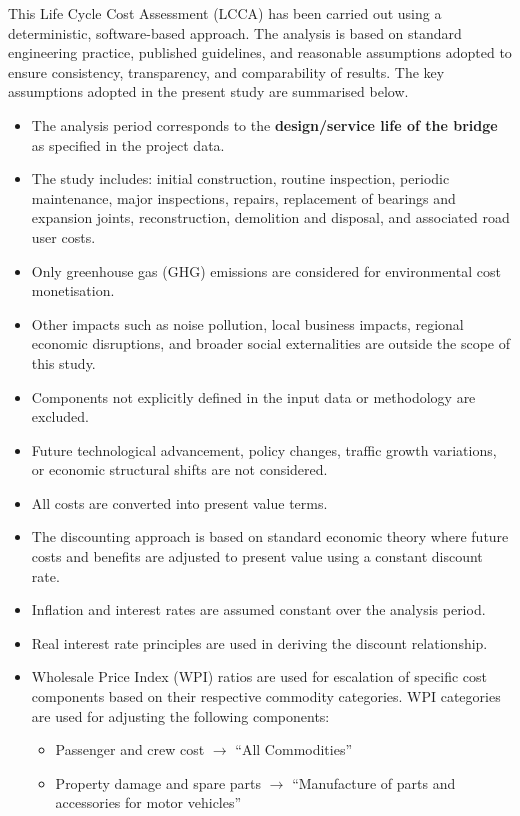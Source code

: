 \documentclass[12pt,a4paper]{article}
\begin{document}
\noindent
This Life Cycle Cost Assessment (LCCA) has been carried out using a deterministic,
software-based approach. The analysis is based on standard engineering practice,
published guidelines, and reasonable assumptions adopted to ensure consistency,
transparency, and comparability of results. The key assumptions adopted in the
present study are summarised below.

\vspace{0.5em}

\begin{itemize}
\item The analysis period corresponds to the \textbf{design/service life of the bridge} as specified in the project data.
\item The study includes: initial construction, routine inspection, periodic maintenance, major inspections, repairs, replacement of bearings and expansion joints, reconstruction, demolition and disposal, and associated road user costs.
\item Only greenhouse gas (GHG) emissions are considered for environmental cost monetisation.
\item Other impacts such as noise pollution, local business impacts, regional economic disruptions, and broader social externalities are outside the scope of this study.
\item Components not explicitly defined in the input data or methodology are excluded.
\item Future technological advancement, policy changes, traffic growth variations, or economic structural shifts are not considered.
\item All costs are converted into present value terms.
\item The discounting approach is based on standard economic theory where future costs and benefits are adjusted to present value using a constant discount rate.
\item Inflation and interest rates are assumed constant over the analysis period.
\item Real interest rate principles are used in deriving the discount relationship.
\item Wholesale Price Index (WPI) ratios are used for escalation of specific cost components based on their respective commodity categories. WPI categories are used for adjusting the following components:
  \begin{itemize}
  \item Passenger and crew cost $\rightarrow$ ``All Commodities''
  \item Property damage and spare parts $\rightarrow$ ``Manufacture of parts and accessories for motor vehicles''

\end{itemize}
\end{itemize}
\end{document}
